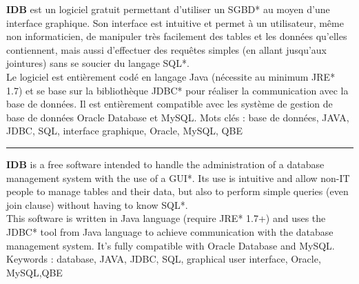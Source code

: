 \textbf{IDB} est un logiciel gratuit permettant d'utiliser un SGBD* au moyen d'une interface graphique. Son interface est intuitive et permet à un utilisateur, même non informaticien, de manipuler très facilement des tables et les données qu'elles contiennent, mais aussi d'effectuer des requêtes simples (en allant jusqu'aux jointures) sans se soucier du langage SQL*.
\\
Le logiciel est entièrement codé en langage Java (nécessite au minimum JRE* 1.7) et se base sur la bibliothèque JDBC* pour réaliser la communication avec la base de données. Il est entièrement compatible avec les système de gestion de base de données Oracle Database et MySQL.
\bigbreak
Mots clés : base de données, JAVA, JDBC, SQL, interface graphique, Oracle, MySQL, QBE

\bigbreak
\rule{\linewidth}{0.4pt}
\bigbreak

\textbf{IDB} is a free software intended to handle the administration of a database management system with the use of a GUI*. Its use is intuitive and allow non-IT people to manage tables and their data, but also to perform simple queries (even join clause) without having to know SQL*.
\\
This software is written in Java language (require JRE* 1.7+) and uses the JDBC* tool from Java language to achieve communication with the database management system. It's fully compatible with Oracle Database and MySQL.
\bigbreak
Keywords : database, JAVA, JDBC, SQL, graphical user interface, Oracle, MySQL,QBE
